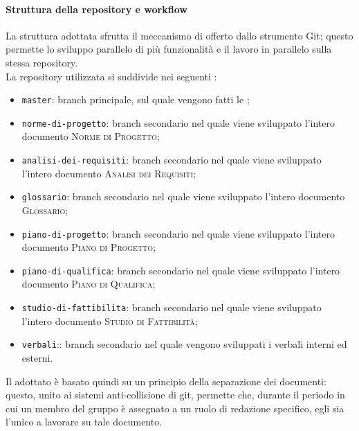 \documentclass[../norme-di-progetto.tex]{subfiles}
\begin{document}
\paragraph{Struttura della repository e workflow}
La struttura adottata sfrutta il meccanismo di  offerto dallo strumento Git; questo permette lo sviluppo parallelo di più funzionalità e il lavoro in parallelo sulla stessa repository. \\
La repository utilizzata si suddivide nei seguenti :
\begin{itemize}
  \item \texttt{master}: branch principale, sul quale vengono fatti le ;
  \item \texttt{norme-di-progetto}: branch secondario nel quale viene sviluppato l'intero documento \textsc{Norme di Progetto};
  \item \texttt{analisi-dei-requisiti}: branch secondario nel quale viene sviluppato l'intero documento \textsc{Analisi dei Requisiti};
  \item \texttt{glossario}: branch secondario nel quale viene sviluppato l'intero documento \textsc{Glossario};
  \item \texttt{piano-di-progetto}: branch secondario nel quale viene sviluppato l'intero documento \textsc{Piano di Progetto};
  \item \texttt{piano-di-qualifica}: branch secondario nel quale viene sviluppato l'intero documento \textsc{Piano di Qualifica};
  \item \texttt{studio-di-fattibilita}: branch secondario nel quale viene sviluppato l'intero documento \textsc{Studio di Fattibilità};
  \item \texttt{verbali}:: branch secondario nel quale vengono sviluppati i verbali interni ed esterni.
\end{itemize}
Il  adottato è basato quindi su un principio della separazione dei documenti: questo, unito ai sistemi anti-collisione di git, permette che, durante il periodo in cui un membro del gruppo è assegnato a un ruolo di redazione specifico, egli sia l'unico a lavorare su tale documento.
\end{document}
